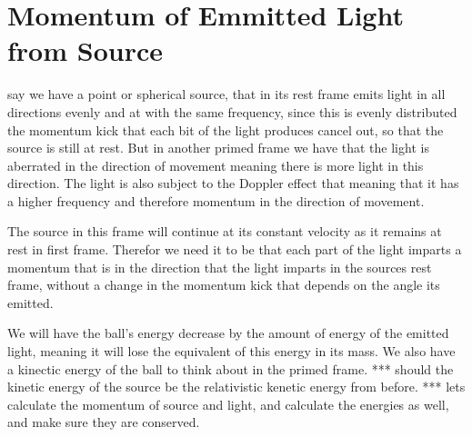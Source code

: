\section{Momentum of Emmitted Light from Source}\label{sect: Momentum of Emmitted Light from Source}

say we have a point or spherical source, that in its rest frame emits light in all directions evenly and at with the same frequency, since this is evenly distributed the momentum kick that each bit of the light produces cancel out, so that the source is still at rest.
But in another primed frame we have that the light is aberrated in the direction of movement meaning there is more light in this direction.
The light is also subject to the Doppler effect that meaning that it has a higher frequency and therefore momentum in the direction of movement.

The source in this frame will continue at its constant velocity as it remains at rest in first frame.
Therefor we need it to be that each part of the light imparts a momentum that is in the direction that the light imparts in the sources rest frame, without a change in the momentum kick that depends on the angle its emitted.

We will have the ball's energy decrease by the amount of energy of the emitted light, meaning it will lose the equivalent of this energy in its mass.
We also have a kinectic energy of the ball to think about in the primed frame.
*** should the kinetic energy of the source be the relativistic kenetic energy from before.
*** lets calculate the momentum of source and light, and calculate the energies as well, and make sure they are conserved.


